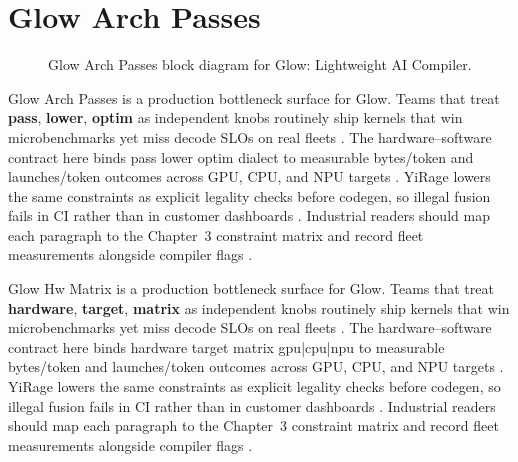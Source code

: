 \section{Glow Arch Passes}
\label{sec:glow_arch_passes}
\begin{figure}[t]
\centering
{}
\caption{Glow Arch Passes block diagram for Glow: Lightweight AI Compiler.}
\label{fig:glow_arch_passes_architecture}
\end{figure}


Glow Arch Passes is a production bottleneck surface for Glow. Teams that treat \textbf{pass}, \textbf{lower}, \textbf{optim} as independent knobs routinely ship kernels that win microbenchmarks yet miss decode SLOs on real fleets \citep{taxbreak2026,semianalysis2024tma}. The hardware--software contract here binds pass lower optim dialect to measurable bytes/token and launches/token outcomes across GPU, CPU, and NPU targets \citep{memoryfloor2026,amd2024xdna}. YiRage lowers the same constraints as explicit legality checks before codegen, so illegal fusion fails in CI rather than in customer dashboards \citep{nvidia2022hopper,amd2024aie}. Industrial readers should map each paragraph to the Chapter~3 constraint matrix and record fleet measurements alongside compiler flags \citep{semianalysis2024tma,dlbook}.

Glow Hw Matrix is a production bottleneck surface for Glow. Teams that treat \textbf{hardware}, \textbf{target}, \textbf{matrix} as independent knobs routinely ship kernels that win microbenchmarks yet miss decode SLOs on real fleets \citep{liu2024deepseekv3,memoryfloor2026}. The hardware--software contract here binds hardware target matrix gpu|cpu|npu to measurable bytes/token and launches/token outcomes across GPU, CPU, and NPU targets \citep{patel2025llminference,nvidia2022hopper}. YiRage lowers the same constraints as explicit legality checks before codegen, so illegal fusion fails in CI rather than in customer dashboards \citep{taxbreak2026,semianalysis2024tma}. Industrial readers should map each paragraph to the Chapter~3 constraint matrix and record fleet measurements alongside compiler flags \citep{memoryfloor2026,amd2024xdna}.

